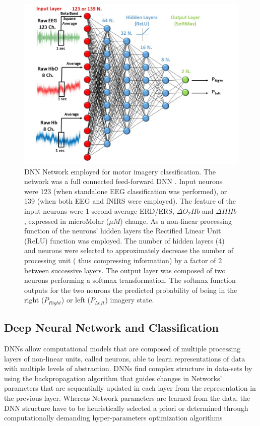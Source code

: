 \documentclass[12pt]{iopart}
\begin{document}
\begin{figure}
	\includegraphics[width=\linewidth]{Slide3.JPG}
	\caption{DNN Network employed for motor imagery classification. The network was a full connected feed-forward  DNN . Input neurons were 123 (when standalone EEG classification was performed), or 139 (when both EEG and fNIRS were employed). 
	The feature of the input neurons were 1 second average ERD/ERS, $\Delta O_{2}Hb$ and $\Delta HHb$, expressed in microMolar ($\mu M$) change. 
	 As a non-linear processing function of the neurons' hidden layers the Rectified Linear Unit (ReLU) function was employed. 
	 The number of hidden layers (4) and neurons were selected to approximately decrease the number of processing unit ( thus compressing information) by a factor of 2 between successive layers. The output layer was composed of two neurons performing a softmax transformation. The softmax function outputs for the two neurons  the predicted probability of being in the right ($P_{Right}$) or left ($P_{Left}$) imagery state. }
	\label{fig:fig3}
\end{figure}

\subsection{Deep Neural Network and Classification}
DNNs allow computational models that are composed of multiple  processing layers of non-linear units, called neurons, able to learn representations of data with multiple levels of abstraction.
DNNs find complex structure in  data-sets by using the backpropagation algorithm \parencite{hecht1988theory} that guides changes in Networks' parameters that are sequentially updated in each layer from the representation in the previous layer.
Whereas Network parameters are learned from the data, the DNN structure have to be heuristically selected a priori or determined through computationally demanding hyper-parameters optimization algorithms %
\parencite{mackay1996hyperparameters,snoek2012practical,bengio2000gradient}
\end{document}
